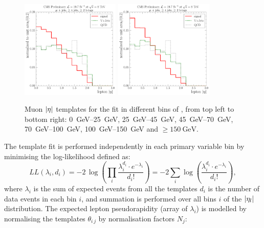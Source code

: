 \begin{figure}[!htbp]
  	\hspace*{\fill} \\
  	\hspace*{\fill}
  	{\includegraphics[width=0.42\textwidth]{measurement/MET/central/fit_templates/muon_templates_bin_100-150}}\hfill
  	{\includegraphics[width=0.42\textwidth]{measurement/MET/central/fit_templates/muon_templates_bin_150-inf}}
  	\hspace*{\fill}
    \caption{Muon $\lvert \eta \rvert$ templates for the fit in different bins of \MET, from top left to bottom right:
    \SIrange{0}{25}{\GeV}, \SIrange{25}{45}{\GeV}, \SIrange{45}{70}{\GeV}, \SIrange{70}{100}{\GeV},
    \SIrange{100}{150}{\GeV} and $\geq \SI{150}{\GeV}$.}
    \label{fig:fit_templates_MET_muon}
\end{figure}




The template fit is performed independently in each primary variable bin by minimising the log-likelihood defined as:
\begin{equation}
\label{eq:xsection_loglikelihood}
LL(\lambda_i,d_i)=-2\,\log{\left(\prod\limits_{i}\frac{\lambda_i^{d_i}\cdot
e^{-\lambda_i}}{d_i!}\right)}=-2\sum\limits_{i}\log{\left(\frac{\lambda_i^{d_i}\cdot e^{-\lambda_i}}{d_i!}\right)},
\end{equation}
where $\lambda_i$ is the sum of expected events from all the templates $d_i$ is the number of data events in each bin
$i$, and summation is performed over all bins $i$ of the $\lvert \eta_l \rvert$ distribution. The expected lepton
pseudorapidity (array of $\lambda_i$) is modelled by normalising the templates $\theta_{i\,j}$ by normalisation factors
$N_j$:

